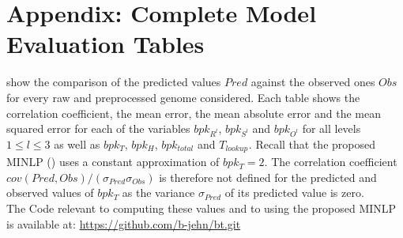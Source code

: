 \documentclass[a4paper,titlepage,onecolumn,oneside,12pt,nenglish,titlepage=firstiscover]{scrbook}
\theoremstyle{plain} %
\theoremstyle{definition} %
\theoremstyle{remark} %
\theoremstyle{plain}
\newcommand{\level}{l}
\newcommand{\timeForOperationOnStructure}[2]{T_{#1_{#2}}} %
\begin{document}
\printbibliography[heading=bibintoc,title={Bibliography}]

\appendix
\chapter*{Appendix: Complete Model Evaluation Tables} \label{appendix}
show the comparison of the predicted values $Pred$ against the observed ones $Obs$ for every raw and preprocessed genome considered. Each table shows the correlation coefficient, the mean error, the mean absolute error and the mean squared error for each of the variables $bpk_{R^\level}$, $bpk_{S^\level}$ and $bpk_{O^\level}$ for all levels $1 \leq \level \leq 3$ as well as $bpk_T$, $bpk_H$, $bpk_{total}$ and $\timeForOperationOnStructure{lookup}{}$. Recall that the proposed MINLP () uses a constant approximation of $bpk_T = 2$. The correlation coefficient $cov(Pred,Obs)/(\sigma_{Pred} \sigma_{Obs})$ is therefore not defined for the predicted and observed values of $bpk_T$ as the variance $\sigma_{Pred}$ of its predicted value is zero.\\
The Code relevant to computing these values and to using the proposed MINLP is available at: \url{https://github.com/b-jehn/bt.git}



\end{document}
